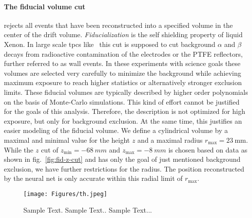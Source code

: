 \paragraph{The fiducial volume cut} rejects all events that have been reconstructed into a specified volume in the center of the drift volume.
\emph{Fiducialization} is the self shielding property of liquid Xenon.
In large scale \gls{tpc}s like \nton ~this cut is supposed to cut background $\alpha$ and $\beta$ decays from radioactive contamination of the electrodes or the PTFE reflectors, further referred to as wall events.
In these experiments with science goals these volumes are selected very carefully to minimize the background while achieving maximum exposure to reach higher statistics or alternatively stronger exclusion limits.
These fiducial volumes are typically described by higher order polynomials on the basis of Monte-Carlo simulations. %
This kind of effort cannot be justified for the goals of this analysis.
Therefore, the description is not optimized for high exposure, but only for background exclusion.
At the same time, this justifies an easier modeling of the fiducial volume.
We define a cylindrical volume by a maximal and minimal value for the height $z$ and a maximal radius $r_\mathrm{max} = \SI{23}{\milli\m}$.
While the $z$ cut of $z_\mathrm{min}= \SI{-68}{mm}$ and $z_\mathrm{max}= \SI{-8}{mm}$ is chosen based on data as shown in fig.~\ref{fig:fid-z-cut} and has only the goal of just mentioned background exclusion, we have further restrictions for the radius.
The position reconstructed by the neural net is only accurate within this radial limit of $r_\mathrm{max}$\cite{ABism}.


\begin{figure}[H]
\centering
\texttt{[image: Figures/th.jpeg]}  %
\caption[Area-Width Histogram smaller S1 after Fid. Cut]{
        Sample Text.
        Sample Text..
        Sample Text...
    }
\label{fig:other_s1_area_width}
\end{figure}


